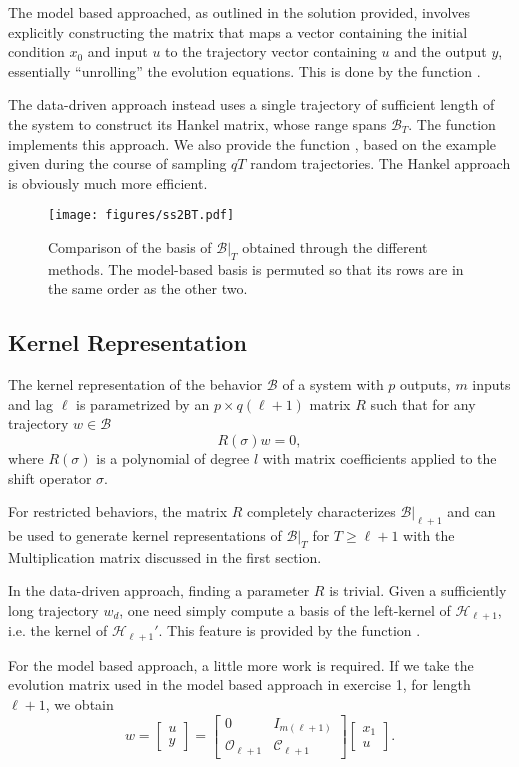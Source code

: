 \documentclass[11pt]{article}
\def\B{\mathscr{B}}
\begin{document}
The model based approached, as outlined in the solution provided, involves explicitly constructing the matrix that maps a vector containing the initial condition $x_0$ and input $u$ to the trajectory vector containing $u$ and the output $y$, essentially ``unrolling'' the evolution equations. This is done by the function .

The data-driven approach instead uses a single trajectory of sufficient length of the system to construct its Hankel matrix, whose range spans $\B_T$. The function  implements this approach. We also provide the function , based on the example given during the course of sampling $qT$ random trajectories. The Hankel approach is obviously much more efficient.

\begin{figure}
  \centering
  \texttt{[image: figures/ss2BT.pdf]}
  \caption{Comparison of the basis of $\B|_T$ obtained through the different methods. The model-based basis is permuted so that its rows are in the same order as the other two.}
\end{figure}

\subsection*{Kernel Representation}
The kernel representation of the behavior $\B$ of a system with $p$ outputs, $m$ inputs and lag $\ell$ is parametrized by an $p \times q(\ell + 1)$ matrix $R$ such that for any trajectory $w \in \B$
$$ R(\sigma) w = 0, $$
where $R(\sigma)$ is a polynomial of degree $l$ with matrix coefficients applied to the shift operator $\sigma$.

For restricted behaviors, the matrix $R$ completely characterizes $\B|_{\ell+1}$ and can be used to generate kernel representations of $\B|_T$ for $T \ge \ell +1$ with the Multiplication matrix discussed in the first section.

In the data-driven approach, finding a parameter $R$ is trivial. Given a sufficiently long trajectory $w_d$, one need simply compute a basis of the left-kernel of $\mathscr{H}_{\ell+1}$, i.e. the kernel of $\mathscr{H}_{\ell+1}'$. This feature is provided by the function .

For the model based approach, a little more work is required. If we take the evolution matrix used in the model based approach in exercise 1, for length $\ell + 1$, we obtain
$$ w = \begin{bmatrix}
  u \\
  y
\end{bmatrix} = \begin{bmatrix}
  0 & I_{m(\ell+1)} \\
  \mathscr{O}_{\ell+1} & \mathscr{C}_{\ell+1}
\end{bmatrix} \begin{bmatrix}
  x_1 \\
  u
\end{bmatrix}.$$
\end{document}
